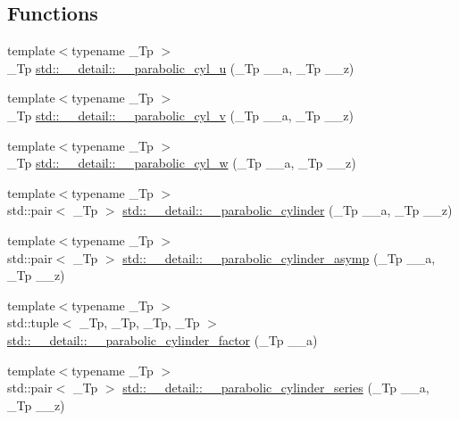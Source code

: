 \subsection*{Functions}
\begin{DoxyCompactItemize}
\item 
{\footnotesize template$<$typename \+\_\+\+Tp $>$ }\\\+\_\+\+Tp \hyperlink{namespacestd_1_1____detail_a2dd1f3c65465ff1ac686039242d1ed33}{std\+::\+\_\+\+\_\+detail\+::\+\_\+\+\_\+parabolic\+\_\+cyl\+\_\+u} (\+\_\+\+Tp \+\_\+\+\_\+a, \+\_\+\+Tp \+\_\+\+\_\+z)
\item 
{\footnotesize template$<$typename \+\_\+\+Tp $>$ }\\\+\_\+\+Tp \hyperlink{namespacestd_1_1____detail_a78f6f545aa962898c0015e67c92102d3}{std\+::\+\_\+\+\_\+detail\+::\+\_\+\+\_\+parabolic\+\_\+cyl\+\_\+v} (\+\_\+\+Tp \+\_\+\+\_\+a, \+\_\+\+Tp \+\_\+\+\_\+z)
\item 
{\footnotesize template$<$typename \+\_\+\+Tp $>$ }\\\+\_\+\+Tp \hyperlink{namespacestd_1_1____detail_a2345cbbabd1f772825c48a37948efef4}{std\+::\+\_\+\+\_\+detail\+::\+\_\+\+\_\+parabolic\+\_\+cyl\+\_\+w} (\+\_\+\+Tp \+\_\+\+\_\+a, \+\_\+\+Tp \+\_\+\+\_\+z)
\item 
{\footnotesize template$<$typename \+\_\+\+Tp $>$ }\\std\+::pair$<$ \+\_\+\+Tp $>$ \hyperlink{namespacestd_1_1____detail_a076674b0f32442cfa8fc62405fc63b31}{std\+::\+\_\+\+\_\+detail\+::\+\_\+\+\_\+parabolic\+\_\+cylinder} (\+\_\+\+Tp \+\_\+\+\_\+a, \+\_\+\+Tp \+\_\+\+\_\+z)
\item 
{\footnotesize template$<$typename \+\_\+\+Tp $>$ }\\std\+::pair$<$ \+\_\+\+Tp $>$ \hyperlink{namespacestd_1_1____detail_af2b7b871dc45f22a78e67b8f0e2ad810}{std\+::\+\_\+\+\_\+detail\+::\+\_\+\+\_\+parabolic\+\_\+cylinder\+\_\+asymp} (\+\_\+\+Tp \+\_\+\+\_\+a, \+\_\+\+Tp \+\_\+\+\_\+z)
\item 
{\footnotesize template$<$typename \+\_\+\+Tp $>$ }\\std\+::tuple$<$ \+\_\+\+Tp, \+\_\+\+Tp, \+\_\+\+Tp, \+\_\+\+Tp $>$ \hyperlink{namespacestd_1_1____detail_a225ed121102d283eb2c7c8734a5dc70b}{std\+::\+\_\+\+\_\+detail\+::\+\_\+\+\_\+parabolic\+\_\+cylinder\+\_\+factor} (\+\_\+\+Tp \+\_\+\+\_\+a)
\item 
{\footnotesize template$<$typename \+\_\+\+Tp $>$ }\\std\+::pair$<$ \+\_\+\+Tp $>$ \hyperlink{namespacestd_1_1____detail_a790b730b44f1a6bc207e656aa4e61153}{std\+::\+\_\+\+\_\+detail\+::\+\_\+\+\_\+parabolic\+\_\+cylinder\+\_\+series} (\+\_\+\+Tp \+\_\+\+\_\+a, \+\_\+\+Tp \+\_\+\+\_\+z)
\end{DoxyCompactItemize}


